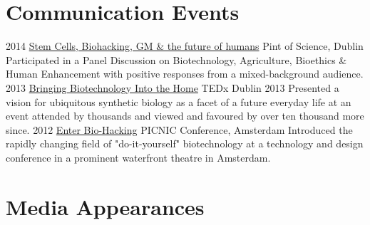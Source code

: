 \documentclass[]{friggeri-cv} %
\begin{document}

\section{Communication Events}

\begin{entrylist}
\entry
{2014}
{\href{http://www.pintofscience.ie}{Stem Cells, Biohacking, GM \& the future of humans}}
{Pint of Science, Dublin}
{Participated in a Panel Discussion on Biotechnology, Agriculture, Bioethics \& Human Enhancement
with positive responses from a mixed-background audience. 
}
\entry
{2013}
{\href{https://www.youtube.com/watch?v=g_ZswrLFSdo}{Bringing Biotechnology Into the Home}}
{TEDx Dublin 2013}
{Presented a vision for ubiquitous synthetic biology as a facet of a future everyday life at
an event attended by thousands and viewed and favoured by over ten thousand more since.
}
\entry
{2012}
{\href{http://vimeo.com/51144273}{Enter Bio-Hacking}}
{PICNIC Conference, Amsterdam}
{Introduced the rapidly changing field of "do-it-yourself" biotechnology at a technology
and design conference in a prominent waterfront theatre in Amsterdam.}
\end{entrylist}


\section{Media Appearances}
\end{document}
